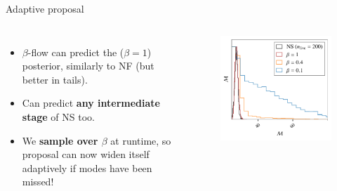 \documentclass[aspectratio=169]{beamer}
\begin{document}
\begin{frame}{Adaptive proposal}
\begin{columns}
    \begin{itemize}
        \item $\beta$-flow can predict the ($\beta = 1$) posterior, similarly to NF (but better in tails).
        \item Can predict \textbf{any intermediate stage} of NS too.
        \item We \textbf{sample over $\beta$} at runtime, so proposal can now widen itself adaptively if modes have been missed!
    \end{itemize}
\begin{figure}
    \centering
    \includegraphics[width=1\textwidth]{Ca_Foscari Beamer/presentation_beta_1.pdf}
\end{figure}
\end{columns}   
\end{frame}
\end{document}
